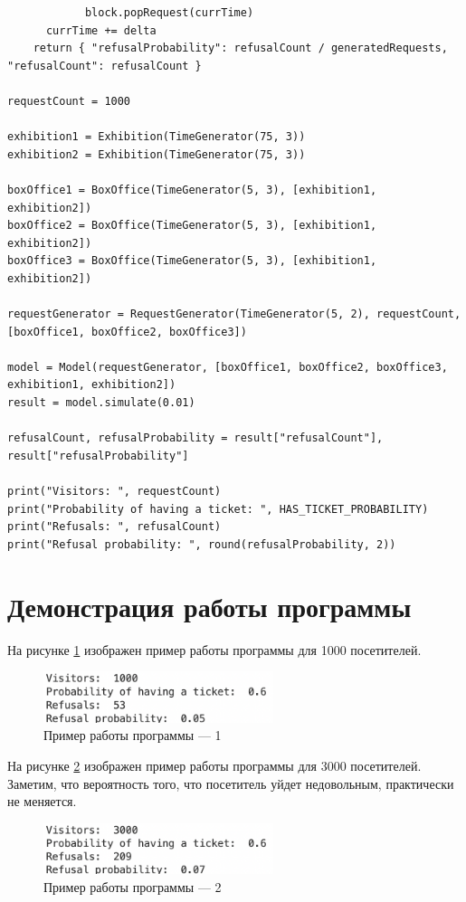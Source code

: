 \documentclass[12pt]{report}
\begin{document}
\begin{lstlisting}
            block.popRequest(currTime)
      currTime += delta
    return { "refusalProbability": refusalCount / generatedRequests, "refusalCount": refusalCount }

requestCount = 1000

exhibition1 = Exhibition(TimeGenerator(75, 3))
exhibition2 = Exhibition(TimeGenerator(75, 3))

boxOffice1 = BoxOffice(TimeGenerator(5, 3), [exhibition1, exhibition2])
boxOffice2 = BoxOffice(TimeGenerator(5, 3), [exhibition1, exhibition2])
boxOffice3 = BoxOffice(TimeGenerator(5, 3), [exhibition1, exhibition2])

requestGenerator = RequestGenerator(TimeGenerator(5, 2), requestCount, [boxOffice1, boxOffice2, boxOffice3])

model = Model(requestGenerator, [boxOffice1, boxOffice2, boxOffice3, exhibition1, exhibition2])
result = model.simulate(0.01)

refusalCount, refusalProbability = result["refusalCount"], result["refusalProbability"]

print("Visitors: ", requestCount)
print("Probability of having a ticket: ", HAS_TICKET_PROBABILITY)
print("Refusals: ", refusalCount)
print("Refusal probability: ", round(refusalProbability, 2))
\end{lstlisting}


\section*{Демонстрация работы программы}
На рисунке \ref{fig:pic1} изображен пример работы программы для 1000 посетителей.

\begin{figure}[h!btp]
	\centering
	\includegraphics[width=0.6\textwidth]{inc/pic1.png}
	\caption{Пример работы программы --- 1}
	\label{fig:pic1}	
\end{figure}
\clearpage

На рисунке \ref{fig:pic2} изображен пример работы программы для 3000 посетителей. Заметим, что вероятность того, что посетитель уйдет недовольным, практически не меняется.

\begin{figure}[h!btp]
	\centering
	\includegraphics[width=0.6\textwidth]{inc/pic2.png}
	\caption{Пример работы программы --- 2}
	\label{fig:pic2}	
\end{figure}
\end{document}
